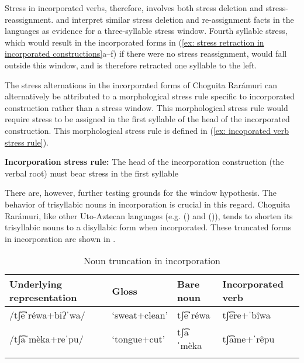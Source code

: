 Stress in incorporated verbs, therefore, involves both stress deletion and stress-reassignment. \citet{brambila1953gramatica} and \citet{miller1996guarijio} interpret similar stress deletion and re-assignment facts in the  languages as evidence for a three-syllable stress window. Fourth syllable stress, which would result in the incorporated forms in (\ref{ex: stress retraction in incorporated constructions}a--f) if there were no stress reassignment, would fall outside this window, and is therefore retracted one syllable to the left.

The stress alternations in the incorporated forms of Choguita Rarámuri can alternatively be attributed to a morphological stress rule specific to incorporated construction rather than a stress window. This morphological stress rule would require stress to be assigned in the first syllable of the head of the incorporated construction. This morphological stress rule is defined in (\ref{ex: incoporated verb stress rule}).

\ea\label{ex: incoporated verb stress rule}

\textbf{Incorporation stress rule:} The head of the incorporation construction (the verbal root) must bear stress in the first syllable

\z

There are, however, further testing grounds for the window hypothesis. The behavior of trisyllabic nouns in incorporation is crucial in this regard. Choguita Rarámuri, like other {Uto-Aztecan} languages (e.g.  (\citealt{sapir1930southern}) and  (\citealt{zigmond1991kawaiisu})), tends to shorten its trisyllabic nouns to a disyllabic form when incorporated. These truncated forms in incorporation are shown in .

\begin{table}
\caption{Noun truncation in incorporation}
\label{tab:truncation-incorporation}

\begin{tabularx}{\textwidth}{QXXQ}
\lsptoprule
\textbf{Underlying} \textbf{representation}& \textbf{Gloss} & \textbf{Bare} \textbf{noun}& \textbf{Incorporated} \textbf{verb}\\
\midrule
/tʃ͡eˈréwa+biʔˈwa/ & ‘sweat+clean’ &  tʃ͡eˈréwa &  tʃ͡ere+ˈbîwa\\
/tʃ͡aˈmèka+reˈpu/ &  ‘tongue+cut’&  tʃ͡aˈmèka &  tʃ͡ame+ˈrêpu\\
\lspbottomrule
\end{tabularx}
\end{table}

